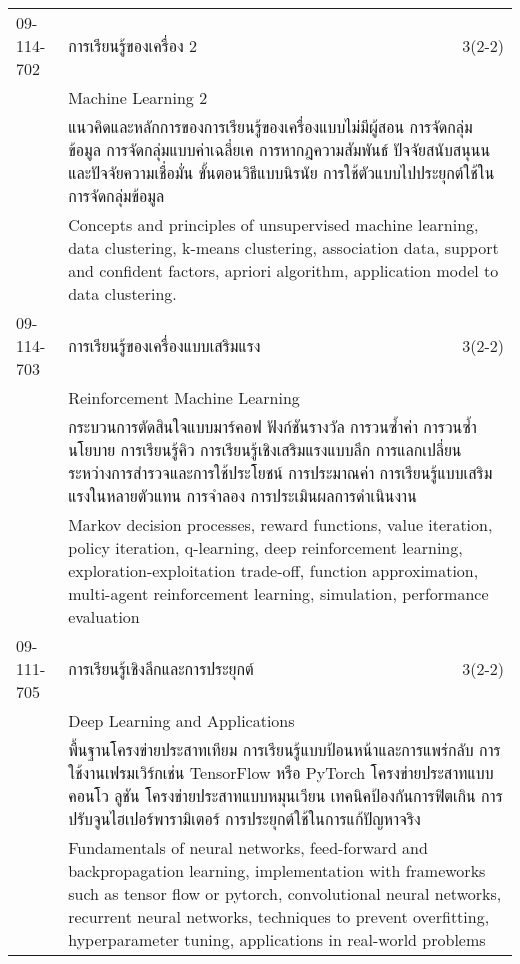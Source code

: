 \begin{longtable}{p{}p{}r{}}
09-114-702 & การเรียนรู้ของเครื่อง 2 & 3(2-2)\\*
 & Machine Learning 2 & \phantom{x} \vspace{3mm} \\*
&  \multicolumn{2}{p{0.75\textwidth}}{แนวคิดและหลักการของการเรียนรู้ของเครื่องแบบไม่มีผู้สอน การจัดกลุ่มข้อมูล การจัดกลุ่มแบบค่าเฉลี่ยเค การหากฎความสัมพันธ์ ปัจจัยสนับสนุนนและปัจจัยความเชื่อมั่น ขั้นตอนวิธีแบบนิรนัย การใช้ตัวแบบไปประยุกต์ใช้ในการจัดกลุ่มข้อมูล} \vspace{3mm} \\*
&  \multicolumn{2}{p{0.75\textwidth}}{Concepts and principles of unsupervised machine learning, data clustering, k-means clustering, association data, support and confident factors, apriori algorithm, application model to data clustering.} \vspace{8mm} \\*
09-114-703 & การเรียนรู้ของเครื่องแบบเสริมแรง & 3(2-2)\\*
 & Reinforcement Machine Learning & \phantom{x} \vspace{3mm} \\*
&  \multicolumn{2}{p{0.75\textwidth}}{กระบวนการตัดสินใจแบบมาร์คอฟ ฟังก์ชันรางวัล การวนซ้ำค่า การวนซ้ำนโยบาย การเรียนรู้คิว การเรียนรู้เชิงเสริมแรงแบบลึก การแลกเปลี่ยนระหว่างการสำรวจและการใช้ประโยชน์ การประมาณค่า การเรียนรู้แบบเสริมแรงในหลายตัวแทน การจำลอง การประเมินผลการดำเนินงาน} \vspace{3mm} \\*
&  \multicolumn{2}{p{0.75\textwidth}}{Markov decision processes, reward functions, value iteration, policy iteration, q-learning, deep reinforcement learning, exploration-exploitation trade-off, function approximation, multi-agent reinforcement learning, simulation, performance evaluation} \vspace{8mm} \\*
09-111-705 & การเรียนรู้เชิงลึกและการประยุกต์ & 3(2-2)\\*
 & Deep Learning and Applications & \phantom{x} \vspace{3mm} \\*
&  \multicolumn{2}{p{0.75\textwidth}}{พื้นฐานโครงข่ายประสาทเทียม การเรียนรู้แบบป้อนหน้าและการแพร่กลับ การใช้งานเฟรมเวิร์กเช่น TensorFlow หรือ PyTorch โครงข่ายประสาทแบบคอนโว ลูชัน โครงข่ายประสาทแบบหมุนเวียน เทคนิคป้องกันการฟิตเกิน การปรับจูนไฮเปอร์พารามิเตอร์ การประยุกต์ใช้ในการแก้ปัญหาจริง} \vspace{3mm} \\*
&  \multicolumn{2}{p{0.75\textwidth}}{Fundamentals of neural networks, feed-forward and backpropagation learning, implementation with frameworks such as tensor flow or pytorch, convolutional neural networks, recurrent neural networks, techniques to prevent overfitting, hyperparameter tuning, applications in real-world problems} \vspace{8mm} \\*

\end{longtable}
